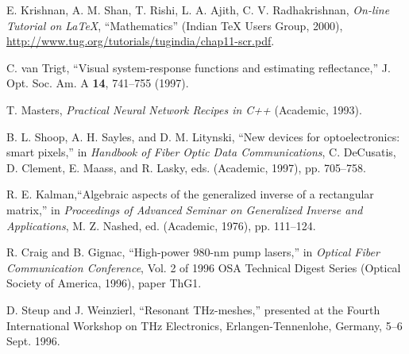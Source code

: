 \documentclass[letterpaper,10pt]{article}
\begin{document}
\begin{thebibliography}{99}

 E. Krishnan, A. M. Shan, T. Rishi, L. A. Ajith, C. V.
Radhakrishnan, \textit{On-line Tutorial on \LaTeX{}},
``Mathematics'' (Indian \TeX{} Users Group, 2000), \\
\url{http://www.tug.org/tutorials/tugindia/chap11-scr.pdf}.

 C. van Trigt, ``Visual system-response functions and estimating reflectance,''
J. Opt. Soc. Am. A \textbf{14}, 741--755 (1997).

 T. Masters, \emph{Practical Neural Network Recipes in C++} (Academic, 1993).

 B. L. Shoop, A. H. Sayles, and D. M. Litynski, ``New devices for optoelectronics: smart pixels,''
in \emph{Handbook of Fiber Optic Data Communications},
C. DeCusatis, D. Clement, E. Maass, and R. Lasky, eds. (Academic, 1997), pp. 705--758.

 R. E. Kalman,``Algebraic aspects of the generalized inverse of a rectangular matrix,'' in
\emph{Proceedings of Advanced Seminar on Generalized Inverse and Applications}, M. Z. Nashed, ed. (Academic, 1976), pp. 111--124.

 R. Craig and B. Gignac, ``High-power 980-nm pump lasers,''
in \emph{Optical Fiber Communication Conference}, Vol. 2 of 1996 OSA Technical Digest Series (Optical Society of America, 1996), paper ThG1.

 D. Steup and J. Weinzierl, ``Resonant THz-meshes,''
presented at the Fourth International Workshop on THz Electronics, Erlangen-Tennenlohe, Germany, 5--6 Sept. 1996.

\end{thebibliography}
\end{document}
